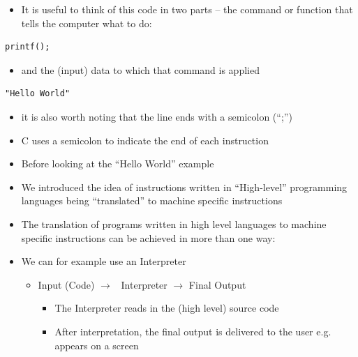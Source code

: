 \documentclass{beamer}
\begin{document}
\begin{frame}[fragile]
\begin{itemize}
\item It is useful to think of this code in two parts -- the command or function that tells the
computer what to do:
\end{itemize}

\begin{block}{}
\begin{lstlisting}
printf();
\end{lstlisting}
\end{block}

\begin{itemize}
\item and the (input) data to which that command is applied
\end{itemize}

\begin{block}{}
\begin{lstlisting}
"Hello World"
\end{lstlisting}
\end{block}

\begin{itemize}
\item it is also worth noting that the line ends with a semicolon (``;'')
\item C uses a semicolon to indicate the end of each instruction 
\end{itemize}
\end{frame}

\begin{frame}
\begin{itemize}
\item Before looking at the ``Hello World'' example
\item We introduced the idea of instructions written in ``High-level'' programming languages being ``translated'' to machine specific instructions
\end{itemize}
\end{frame}

\begin{frame}
\begin{itemize}
\item The translation of programs written in high level languages to machine specific instructions can be achieved in more than one way:
\item We can for example use an Interpreter

\begin{itemize}
\item Input (Code) $\rightarrow $ \ Interpreter $\rightarrow $ Final Output

\begin{itemize}
\item The Interpreter reads in the (high level) source code
\item After interpretation, the final output is delivered to the user e.g. appears on a screen
\end{itemize}
\end{itemize}
\end{itemize}
\end{frame}
\end{document}

